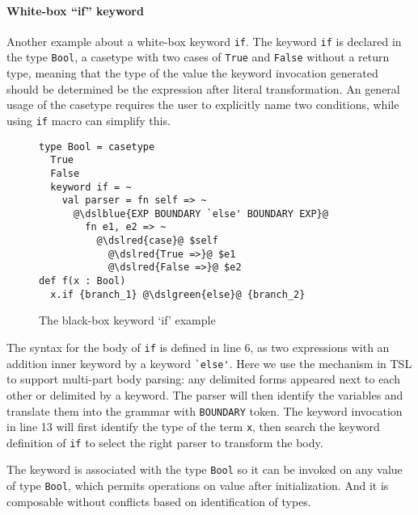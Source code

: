 \documentclass{sig-alternate}
\newcommand{\dslgreen}[1]{\textcolor[HTML]{339933}{#1}}
\newcommand{\dslblue}[1]{\textcolor[HTML]{336699}{#1}}
\newcommand{\dslred}[1]{\textcolor[HTML]{FF0033}{#1}}
\begin{document}
\paragraph{White-box ``if'' keyword}
Another example about a white-box keyword \verb|if|. The keyword \verb|if| is declared in the type \verb|Bool|, a casetype with two cases of \verb|True| and \verb|False| without a return type, meaning that the type of the value the keyword invocation generated should be determined be the expression after literal transformation. An general usage of the casetype requires the user to explicitly name two conditions, while using \verb|if| macro can simplify this.
\begin{figure}[ht]
\begin{lstlisting}[style=wyvern]
type Bool = casetype 
  True
  False
  keyword if = ~
    val parser = fn self => ~
      @\dslblue{EXP BOUNDARY `else' BOUNDARY EXP}@
        fn e1, e2 => ~
          @\dslred{case}@ $self
            @\dslred{True =>}@ $e1
            @\dslred{False =>}@ $e2
def f(x : Bool)
  x.if {branch_1} @\dslgreen{else}@ {branch_2}
\end{lstlisting}
\vspace{-8px}
\caption{The black-box keyword `if' example}
\vspace{-10px}
\label{if-example}
\end{figure}

The syntax for the body of \verb|if| is defined in line 6, as two expressions with an addition inner keyword by a keyword \verb|`else'|. Here we use the mechanism in TSL to support multi-part body parsing: any delimited forms appeared next to each other or delimited by a keyword. The parser will then identify the variables and translate them into the grammar with \verb|BOUNDARY| token. The keyword invocation in line 13 will first identify the type of the term \verb|x|, then search the keyword definition of \verb|if| to select the right parser to transform the body. 

The keyword is associated with the type \verb|Bool| so it can be invoked on any value of type \verb|Bool|, which permits operations on value after initialization. And it is composable without conflicts based on identification of types. 
\end{document}
